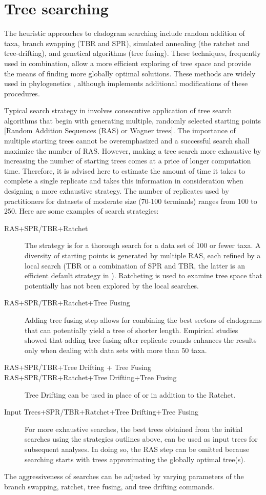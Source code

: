 \section{Tree searching}
The heuristic approaches to cladogram searching include random addition of taxa, branch swapping (TBR and SPR), simulated annealing (the ratchet and tree-drifting), and genetical algorithms (tree fusing). These techniques, frequently used in combination, allow a more efficient exploring of tree space and provide the means of finding more globally optimal solutions. These methods are widely used in phylogenetics \cite{felsenstein2004a, wheeleretal2006}, although \poy implements additional modifications of these procedures.

Typical search strategy in \poy involves consecutive application of tree search algorithms that begin with generating multiple, randomly selected starting points [Random Addition Sequences (RAS) or Wagner trees]. The importance of multiple starting trees cannot be overemphasized and a successful search shall maximize the number of RAS. However, making a tree search more exhaustive by increasing the number of starting trees comes at a price of longer computation time. Therefore, it is advised here to estimate the amount of time it takes to complete a single replicate and takes this information in consideration when designing a more exhaustive strategy. The  number of replicates used by \poy practitioners for datasets of moderate size (70-100 terminals) ranges from 100 to 250. Here are some examples of search strategies:
\begin{description}
\item[RAS+SPR/TBR+Ratchet] The strategy is for a thorough search for a data set of 100 or fewer taxa. A diversity of starting points is generated by multiple RAS, each refined by a local search (TBR or a combination of SPR and TBR, the latter is an efficient default strategy in \poy). Ratcheting is used to examine tree space that potentially has not been explored by the local searches.
\item[RAS+SPR/TBR+Ratchet+Tree Fusing]  Adding tree fusing step allows for combining the best sectors of cladograms that can potentially yield a tree of shorter length. Empirical studies showed that adding tree fusing after replicate rounds enhances the results only when dealing with data sets with more than 50 taxa.
\item[RAS+SPR/TBR+Tree Drifting + Tree Fusing]
\item[RAS+SPR/TBR+Ratchet+Tree Drifting+Tree Fusing] Tree Drifting can be used in place of or in addition to the Ratchet.
\item[Input Trees+SPR/TBR+Ratchet+Tree Drifting+Tree Fusing] For more exhaustive searches, the best trees obtained from the initial searches using the strategies outlines above, can be used as input trees for subsequent analyses. In doing so, the RAS step can be omitted because searching starts with trees approximating the globally optimal tree(s).
\end{description}
The aggressiveness of searches can be adjusted by varying parameters of the branch swapping, ratchet, tree fusing, and tree drifting commands.

